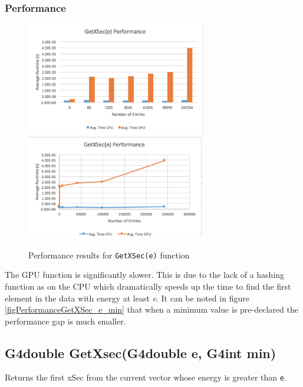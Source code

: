 \documentclass[12pt]{article}
\begin{document}
	\subsubsection{Performance}
    	\begin{figure}[H]
    	\centering
    	\caption{Performance results for \texttt{GetXSec(e)} function}\label{figPerformanceGetXSec_e}
    	\includegraphics[width=0.7\textwidth]{getxsec_e_bar.png}
    	\includegraphics[width=0.7\textwidth]{getxsec_e_line.png}
    	\end{figure}
	The GPU function is significantly slower. This is due to the lack of a hashing function as on the CPU which dramatically speeds up the time to find the first element in the data with energy at least \emph{e}. It can be noted in figure \ref{figPerformanceGetXSec_e_min} that when a minimum value is pre-declared the performance gap is much smaller.
	
\subsection{G4double GetXsec(G4double e, G4int min)}
	Returns the first xSec from the current vector whose energy is greater than \texttt{e}. 
	
\end{document}
